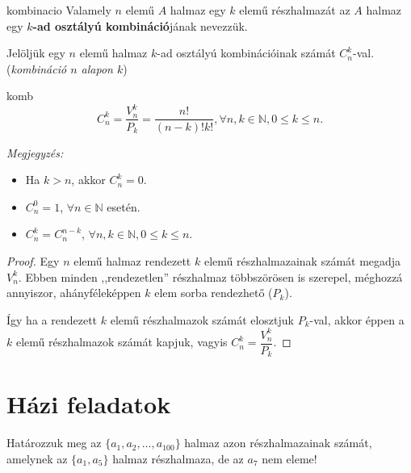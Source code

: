 \begin{definition}{kombinacio}
Valamely $n$ elemű $A$ halmaz egy $k$ elemű részhalmazát az $A$
halmaz egy \textbf{$k$-ad osztályú kombináció}jának nevezzük.
\end{definition}

Jelöljük egy $n$ elemű halmaz $k$-ad osztályú kombinációinak számát
$C_{n}^{k}$-val. (\textit{kombináció $n$ alapon $k$})
\begin{theorem}{komb}
\[
C_{n}^{k}=\dfrac{V_{n}^{k}}{P_{k}}=\dfrac{n!}{(n-k)!k!},\forall n,k\in\mathbb{N},0\leq k\leq n.
\]
\end{theorem}

\textit{Megjegyzés:} 
\begin{itemize}
\item Ha $k>n$, akkor $C_{n}^{k}=0$. 
\item $C_{n}^{0}=1$, $\forall n\in\mathbb{N}$ esetén. 
\item $C_{n}^{k}=C_{n}^{n-k}$, $\forall n,k\in\mathbb{N},0\leq k\leq n.$ 
\end{itemize}
\begin{proof}
Egy $n$ elemű halmaz rendezett $k$ elemű részhalmazainak számát
megadja $V_{n}^{k}$. Ebben minden ,,rendezetlen'' részhalmaz többszörösen
is szerepel, méghozzá annyiszor, ahányféleképpen $k$ elem sorba rendezhető
($P_{k}$).

Így ha a rendezett $k$ elemű részhalmazok számát elosztjuk $P_{k}$-val,
akkor éppen a $k$ elemű részhalmazok számát kapjuk, vagyis $C_{n}^{k}=\dfrac{V_{n}^{k}}{P_{k}}$. 
\end{proof}

\section*{Házi feladatok}
\begin{problem}
Határozzuk meg az $\{a_{1},a_{2},\ldots,a_{100}\}$ halmaz azon részhalmazainak
számát, amelynek az $\{a_{1},a_{5}\}$ halmaz részhalmaza, de az $a_{7}$
nem eleme! 
\end{problem}

